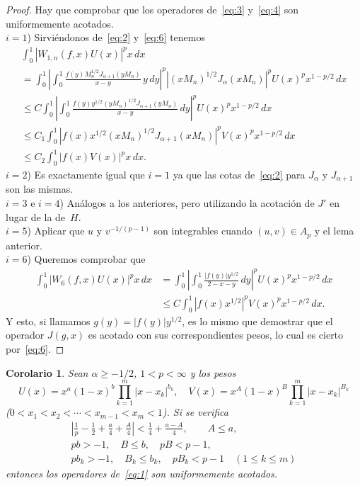 \documentclass[a4paper]{article}
\newtheorem*{corollary*}{Corolario}
\begin{document}
\begin{proof}
Hay que comprobar que los operadores 
de~\eqref{eq:3} y~\eqref{eq:4} son uniformemente acotados.\\
$i = 1$) Sirvi\'endonos de~\eqref{eq:2} y~\eqref{eq:6} tenemos
\begin{multline*}
  \int_{0}^{1} |W_{1,n}(f,x)U(x)|^p x\,dx \\
  = \int_{0}^{1} \left| \int_{0}^{1}
  \frac{f(y)M_{n}^{1/2}J_{\alpha+1}(yM_{n})}{x - y} \, y\,dy \right|^p
  |(xM_{n})^{1/2} J_{\alpha}(xM_{n})|^p U(x)^p x^{1-p/2} \,dx \\
  \leq C\int_{0}^{1} \left| \int_{0}^{1}
  \frac{f(y)y^{1/2}(yM_{n})^{1/2} J_{\alpha+1}(yM_{n})}{x - y} \,dy \right|^p
  U(x)^p x^{1-p/2}\,dx \\
  \leq C_{1} \int_{0}^{1} |f(x) x^{1/2} (xM_{n})^{1/2} J_{\alpha+1}(xM_{n})|^p
  V(x)^p x^{1-p/2}\,dx \\
  \leq C_{2} \int_{0}^{1} |f(x)V(x)|^p x\,dx.
\end{multline*}
$i = 2$) Es exactamente igual que $i = 1$ ya que las cotas de~\eqref{eq:2} 
para $J_{\alpha}$ y $J_{\alpha+1}$ son las mismas.\\
$i = 3$ e $i = 4$) An\'alogos a los anteriores, pero utilizando la 
acotaci\'on de $J'$ en lugar de la de~$H$.\\
$i = 5$) Aplicar que $u$ y $v^{-1/(p-1)}$ son integrables cuando $(u,v) 
\in A_p$ y el lema anterior.\\
$i = 6$) Queremos comprobar que
\begin{align*}
 \int_{0}^{1} |W_{6}(f,x)U(x)|^p x\,dx
  &= \int_{0}^{1} \left|\int_{0}^{1} \frac{|f(y)|y^{1/2}}{2-x-y} \,dy \right|^p
  U(x)^p x^{1-p/2}\,dx \\
  &\leq C\int_{0}^{1} |f(x)x^{1/2}|^p V(x)^p x^{1-p/2}\,dx.
\end{align*}
Y esto, si llamamos $g(y) = |f(y)|y^{1/2}$, es lo mismo 
que demostrar que el operador $J(g,x)$ es acotado con sus correspondientes 
pesos, lo cual es cierto por~\eqref{eq:6}.
\end{proof}

\begin{corollary*}
Sean $\alpha \geq -1/2$, $1 < p < \infty$ y los pesos
\begin{equation*}
  U(x) = x^{a}(1-x)^{b} \prod_{k=1}^{m} |x-x_{k}|^{b_k},
  \quad
  V(x) = x^{A}(1-x)^{B} \prod_{k=1}^{m} |x-x_{k}|^{B_k}
\end{equation*}
($0 < x_{1} < x_{2} < \cdots < x_{m-1} < x_{m} < 1$). Si se verifica
\begin{gather*}
  \left| \frac{1}{p} - \frac{1}{2} + \frac{a}{4} + \frac{A}{4}\right|
  < \frac{1}{4} + \frac{a-A}{4}, \qquad A \leq a, \\
  pb > -1,\quad B \leq b,\quad pB < p-1,\\
  pb_{k} > -1,\quad B_{k} \leq b_{k},\quad pB_{k} < p-1 \quad (1 \leq k \leq m)
\end{gather*}
entonces los operadores de~\eqref{eq:1} son uniformemente acotados.
\end{corollary*}
\end{document}
